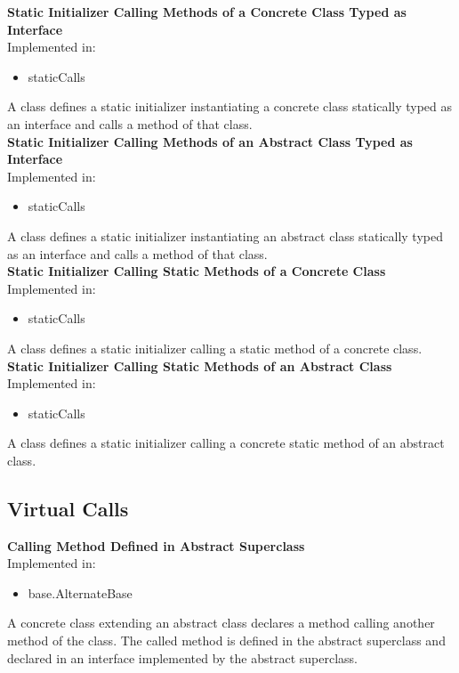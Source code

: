 \documentclass{article}
\begin{document}
\noindent
\textbf{Static Initializer Calling Methods of a Concrete Class Typed as Interface}\\
Implemented in: 
\begin{itemize}
    \item staticCalls
\end{itemize}
A class defines a static initializer instantiating a concrete class statically typed as an interface and calls a method of that class.\\

\noindent
\textbf{Static Initializer Calling Methods of an Abstract Class Typed as Interface}\\
Implemented in: 
\begin{itemize}
    \item staticCalls
\end{itemize}
A class defines a static initializer instantiating an abstract class statically typed as an interface and calls a method of that class.\\

\noindent
\textbf{Static Initializer Calling Static Methods of a Concrete Class}\\
Implemented in: 
\begin{itemize}
    \item staticCalls
\end{itemize}
A class defines a static initializer calling a static method of a concrete class.\\

\noindent
\textbf{Static Initializer Calling Static Methods of an Abstract Class}\\
Implemented in: 
\begin{itemize}
    \item staticCalls
\end{itemize}
A class defines a static initializer calling a concrete static method of an abstract class.\\

\subsection{Virtual Calls}

\textbf{Calling Method Defined in Abstract Superclass}\\
Implemented in: 
\begin{itemize}
    \item base.AlternateBase
\end{itemize}
A concrete class extending an abstract class declares a method calling another method of the class. The called method is defined in the abstract superclass and declared in an interface implemented by the abstract superclass.\\
\end{document}
